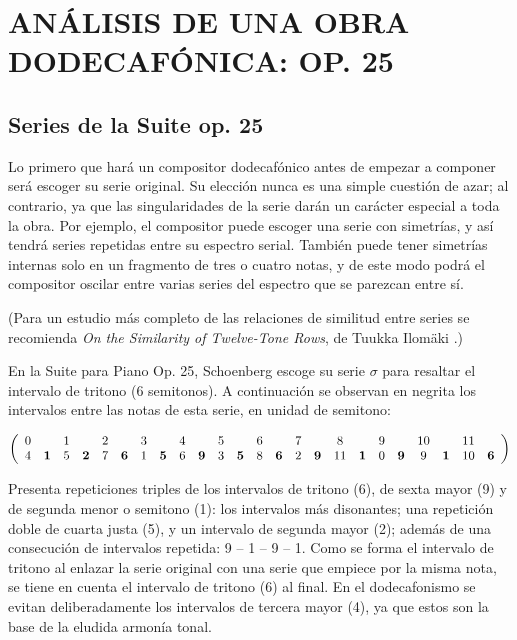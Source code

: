\section{ANÁLISIS DE UNA OBRA DODECAFÓNICA: OP. 25}\label{ch:suite}
	\subsection{Series de la Suite op. 25}
		Lo primero que hará un compositor dodecafónico antes de empezar a componer será escoger su serie original. Su elección nunca es una simple cuestión de azar; al contrario, ya que las singularidades de la serie darán un carácter especial a toda la obra. Por ejemplo, el compositor puede escoger una serie con simetrías, y así tendrá series repetidas entre su espectro serial. También puede tener simetrías internas solo en un fragmento de tres o cuatro notas, y de este modo podrá el compositor oscilar entre varias series del espectro que se parezcan entre sí.
		
		({Para un estudio más completo de las relaciones de similitud entre series se recomienda \emph{On the Similarity of Twelve-Tone Rows}, de Tuukka Ilomäki \cite{ilomaki}.})
		
		En la Suite para Piano Op. 25, Schoenberg escoge su serie $\sigma$ para resaltar el intervalo de tritono (6 semitonos). A continuación se observan en negrita los intervalos entre las notas de esta serie, en unidad de semitono:
		
		{$\left(\begin{array}{*{24}c}
			0&&1&&2&&3&&4&&5&&6&&7&&8&&9&&10&&11&\\
			4&\mathbf{1}&5&\mathbf{2}&7&\mathbf{6}&1&\mathbf{5}&6&\mathbf{9}&3&\mathbf{5}&8&\mathbf{6}&2&\mathbf{9}&11&\mathbf{1}&0&\mathbf{9}&9&\mathbf{1}&10&\mathbf{6}\end{array}\right)$}
				
		Presenta repeticiones triples de los intervalos de tritono (6), de sexta mayor (9) y de segunda menor o semitono (1): los intervalos más disonantes; una repetición doble de cuarta justa (5), y un intervalo de segunda mayor (2); además de una consecución de intervalos repetida: 9 -- 1 -- 9 -- 1. Como se forma el intervalo de tritono al enlazar la serie original con una serie que empiece por la misma nota, se tiene en cuenta el intervalo de tritono (6) al final. En el dodecafonismo se evitan deliberadamente los intervalos de tercera mayor (4), ya que estos son la base de la eludida armonía tonal. \label{serie25}
		

